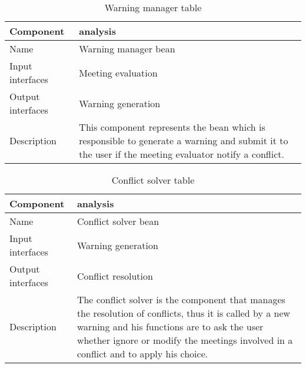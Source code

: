 \begin{flushleft}
	
	\begin{table}[htp]
		
		\begin{tabular}{l|p{7cm}}
			Component&analysis\\
			\hline
			\hline
			Name&Warning manager bean\\
			\hline
			Input interfaces& Meeting evaluation\\
			\hline
			Output interfaces& Warning generation\\
			\hline
			Description&This component represents the bean which is responsible to generate a warning and submit it to the user if the meeting evaluator notify a conflict. \\
			\hline
				
		\end{tabular}
		
		\caption{Warning manager table } 
		\label{tab:warningmanagertable}
		
	\end{table}
	
\end{flushleft}

\begin{flushleft}
	
	\begin{table}[htp]
		
		\begin{tabular}{l|p{7cm}}
			Component&analysis\\
			\hline
			\hline
			Name&Conflict solver bean\\
			\hline
			Input interfaces& Warning generation\\
			\hline
			Output interfaces& Conflict resolution\\
			\hline
			Description&The conflict solver is the component that manages the resolution of conflicts, thus it is called by a new warning and his functions are to ask the user whether ignore or modify the meetings involved in a conflict and to apply his choice. \\
			\hline
			
		\end{tabular}
		
		\caption{Conflict solver table } 
		\label{tab:conflictsolvertable}
		
	\end{table}
	
\end{flushleft}

